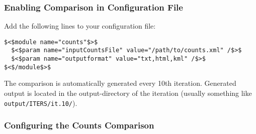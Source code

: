 \documentclass[a4paper,11pt]{report}
\begin{document}
\subsubsection{Enabling Comparison in Configuration File}

Add the following lines to your configuration file:
\begin{verbatim}
$<$module name="counts"$>$
  $<$param name="inputCountsFile" value="/path/to/counts.xml" /$>$
  $<$param name="outputformat" value="txt,html,kml" /$>$
$<$/module$>$

\end{verbatim}

The comparison is automatically generated every 10th iteration.  Generated output is located in the output-directory of the iteration  (usually something like
\texttt{output/ITERS/it.10/}).


\subsubsection{Configuring the Counts Comparison}
\end{document}
